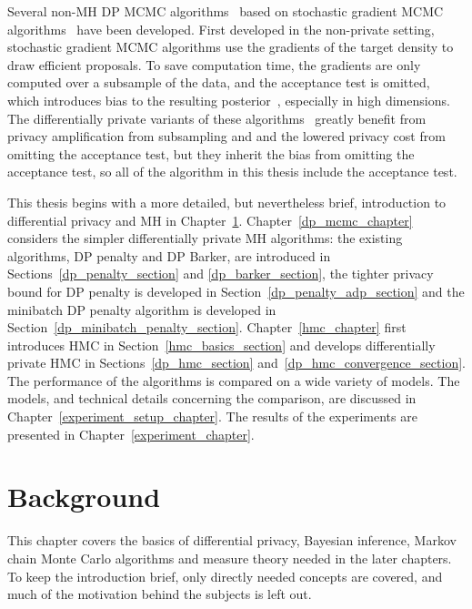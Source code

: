 \documentclass[english,twoside,openright]{HYgraduMLDS}
\begin{document}
Several non-MH DP MCMC algorithms~\cite{WFS15, LCL19} based on
stochastic gradient MCMC algorithms~\cite{WellingT11, CFG14, DFB14} have been developed.
First developed in the non-private setting, stochastic gradient MCMC
algorithms use the gradients of the target density
to draw efficient proposals. To save computation time, the gradients are
only computed over a subsample of the data, and the acceptance test is omitted,
which introduces bias to the resulting posterior~\cite{Bet15}, especially in
high dimensions.
The differentially private variants of these algorithms~\cite{WFS15, LCL19} greatly
benefit from privacy amplification from subsampling and and the lowered
privacy cost from omitting the acceptance test,
but they inherit the bias from omitting the acceptance test, so all of the
algorithm in this thesis include the acceptance test.

This thesis begins with a more detailed, but nevertheless brief, introduction to
differential privacy and MH in Chapter~\ref{background_chapter}.
Chapter~\ref{dp_mcmc_chapter} considers the simpler differentially private
MH algorithms: the existing algorithms, DP penalty and DP Barker, are introduced
in Sections~\ref{dp_penalty_section} and \ref{dp_barker_section},
the tighter privacy bound for DP penalty is developed in
Section~\ref{dp_penalty_adp_section}
and the minibatch DP penalty algorithm is developed in
Section~\ref{dp_minibatch_penalty_section}. Chapter~\ref{hmc_chapter} first
introduces HMC in Section~\ref{hmc_basics_section} and develops differentially
private HMC in Sections~\ref{dp_hmc_section} and~\ref{dp_hmc_convergence_section}.
The performance of the algorithms
is compared on a wide variety of models. The models, and technical details
concerning the comparison, are discussed in Chapter~\ref{experiment_setup_chapter}.
The results of the experiments are presented in Chapter~\ref{experiment_chapter}.

\chapter{Background}\label{background_chapter}

This chapter covers the basics of differential privacy, Bayesian inference,
Markov chain Monte Carlo algorithms and measure theory
needed in the later chapters. To keep
the introduction brief, only directly needed concepts are covered, and much
of the motivation behind the subjects is left out.
\end{document}
